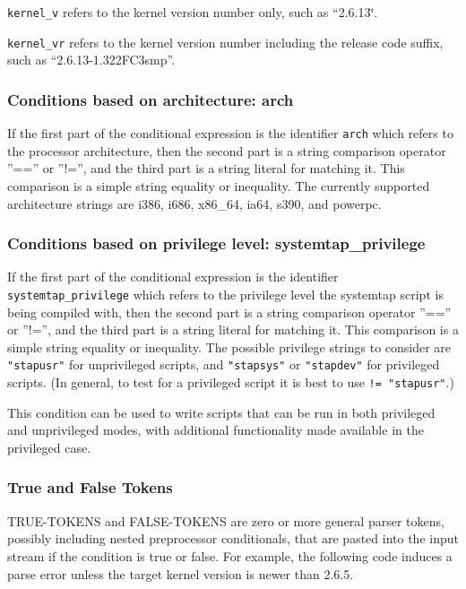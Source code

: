 \documentclass[twoside,english]{article}
\begin{document}
\texttt{kernel\_v} refers to the kernel version number only, such as {}``2.6.13\char`\"{}.

\texttt{kernel\_vr} refers to the kernel version number including the release
code suffix, such as {}``2.6.13-1.322FC3smp''.


\subsubsection{Conditions based on architecture: arch}
If the first part of the conditional expression is the identifier \texttt{arch}
which refers to the processor architecture, then the second part is a string
comparison operator ''=='' or ''!='', and the third part is a string
literal for matching it. This comparison is a simple string equality or inequality.
The currently supported architecture strings are i386, i686, x86\_64, ia64,
s390, and powerpc.

\subsubsection{Conditions based on privilege level: systemtap\_privilege}

If the first part of the conditional expression is the identifier
\texttt{systemtap\_privilege} which refers to the privilege level the
systemtap script is being compiled with, then the second part is a
string comparison operator ''=='' or ''!='', and the third part is a
string literal for matching it. This comparison is a simple string
equality or inequality.  The possible privilege strings to consider
are \verb+"stapusr"+ for unprivileged scripts, and \verb+"stapsys"+ or
\verb+"stapdev"+ for privileged scripts. (In general, to test for a
privileged script it is best to use \verb+!= "stapusr"+.)

This condition can be used to write scripts that can be run in both
privileged and unprivileged modes, with additional functionality made
available in the privileged case.

\subsubsection{True and False Tokens}
TRUE-TOKENS and FALSE-TOKENS are zero or more general parser tokens, possibly
including nested preprocessor conditionals, that are pasted into the input
stream if the condition is true or false. For example, the following code
induces a parse error unless the target kernel version is newer than 2.6.5.
\end{document}
